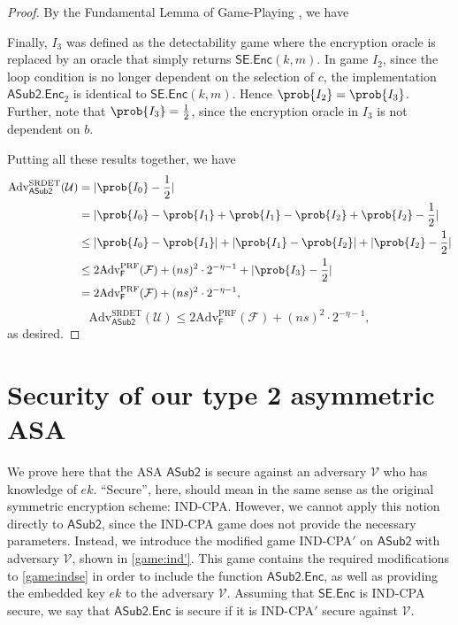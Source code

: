 \begin{proof}
By the Fundamental Lemma of Game-Playing \cite{EC:BelRog06}, we have

Finally, $I_3$ was defined as the detectability game where the encryption oracle is replaced by an oracle that simply returns $\mathsf{SE.Enc}(k,m)$. In game $I_2$, since the loop condition is no longer dependent on the selection of $c$, the implementation $\mathsf{ASub2.Enc}_2$ is identical to $\mathsf{SE.Enc}(k,m)$. Hence $\prob{I_2}=\prob{I_3}$. Further, note that $\prob{I_3}=\frac{1}{2}$, since the encryption oracle in $I_3$ is not dependent on $b$.

Putting all these results together, we have
\iffullversion
\begin{align*}
\text{Adv}^\text{SRDET}_\mathsf{ASub2}(\mathcal{U})
&= |\prob{I_0}-\frac{1}{2}| \\
&= |\prob{I_0}-\prob{I_1}+\prob{I_1}-\prob{I_2}+\prob{I_2}-\frac{1}{2}| \\
&\le |\prob{I_0}-\prob{I_1}|+|\prob{I_1}-\prob{I_2}|+|\prob{I_2}-\frac{1}{2}| \\
&\le 2\text{Adv}^{\text{PRF}}_\mathsf{F}(\mathcal{F}) + (ns)^2\cdot 2^{-\eta-1} + |\prob{I_3}-\frac{1}{2}| \\
&= 2\text{Adv}^{\text{PRF}}_\mathsf{F}(\mathcal{F}) + (ns)^2\cdot 2^{-\eta-1},
\end{align*}
\else
\[
\text{Adv}^\text{SRDET}_\mathsf{ASub2}(\mathcal{U}) \le 2\text{Adv}^{\text{PRF}}_\mathsf{F}(\mathcal{F}) + (ns)^2\cdot 2^{-\eta-1},
\]
\fi
as desired.

\end{proof}

\section{Security of our type 2 asymmetric ASA} \label{sec:security}
We prove here that the ASA $\mathsf{ASub2}$ is secure against an adversary $\mathcal{V}$ who has knowledge of $ek$. ``Secure'', here, should mean in the same sense as the original symmetric encryption scheme: IND-CPA. However, we cannot apply this notion directly to $\mathsf{ASub2}$, since the IND-CPA game does not provide the necessary parameters. Instead, we introduce the modified game IND-CPA$'$ on $\mathsf{ASub2}$ with adversary $\mathcal{V}$, shown in \autoref{game:ind'}. This game contains the required modifications to \autoref{game:indse} in order to include the function $\mathsf{ASub2.Enc}$, as well as providing the embedded key $ek$ to the adversary $\mathcal{V}$. Assuming that $\mathsf{SE.Enc}$ is IND-CPA secure, we say that $\mathsf{ASub2.Enc}$ is secure if it is IND-CPA$'$ secure against $\mathcal{V}$.

